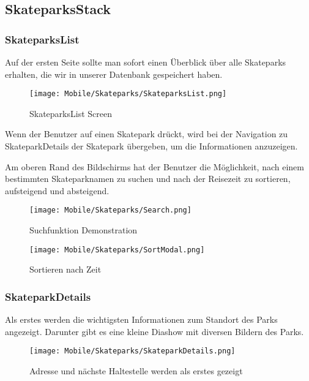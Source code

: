 \subsection{SkateparksStack}
\subsubsection{SkateparksList}
Auf der ersten Seite sollte man sofort einen Überblick über alle Skateparks erhalten, die wir in
unserer Datenbank gespeichert haben.

\begin{figure}[H]
  \begin{center}
    \texttt{[image: Mobile/Skateparks/SkateparksList.png]}
    \caption{SkateparksList Screen}
  \end{center}
\end{figure}

Wenn der Benutzer auf einen Skatepark drückt, wird bei der Navigation zu SkateparkDetails der
Skatepark übergeben, um die Informationen anzuzeigen.

Am oberen Rand des Bildschirms hat der Benutzer die Möglichkeit, nach einem bestimmten
Skateparknamen zu suchen und nach der Reisezeit zu sortieren, aufsteigend und absteigend.

\begin{figure}[H]
  \begin{center}
    \texttt{[image: Mobile/Skateparks/Search.png]}
    \caption{Suchfunktion Demonstration}
  \end{center}
\end{figure}

\begin{figure}[H]
  \begin{center}
    \texttt{[image: Mobile/Skateparks/SortModal.png]}
    \caption{Sortieren nach Zeit}
  \end{center}
\end{figure}

\newpage

\subsubsection{SkateparkDetails}
Als erstes werden die wichtigsten Informationen zum Standort des Parks angezeigt. Darunter gibt es
eine kleine Diashow mit diversen Bildern des Parks.

\begin{figure}[H]
  \begin{center}
    \texttt{[image: Mobile/Skateparks/SkateparkDetails.png]}
    \caption{Adresse und nächste Haltestelle werden als erstes gezeigt}
  \end{center}
\end{figure}

